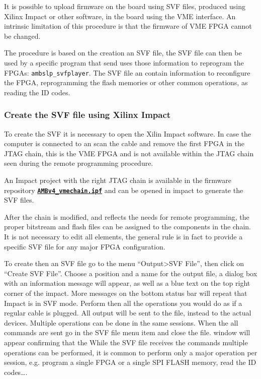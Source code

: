 It is possible to upload firmware on the board using SVF files,
produced using Xilinx Impact or other software, in the board
using the VME interface. An intrinsic limitation of this procedure is
that the firmware of VME FPGA cannot be changed.

The procedure is based on the creation an SVF file, the SVF file can then
be used by a specific program that send uses those information to reprogram
the FPGAs: \texttt{ambslp\_svfplayer}. The SVF file 
an contain information
to reconfigure the FPGA, reprogramming the flash memories or other
common operations, as reading the ID codes.

\subsubsection{Create the SVF file using Xilinx Impact}
To create the SVF it is necessary to open the Xilin Impact software. In case
the computer is connected to an \AMBoard scan the cable and remove the 
first FPGA in the JTAG chain, this is the VME FPGA and is not available
within the JTAG chain seen during the remote programming procedure.

An Impact project with the right JTAG chain is available in the firmware
repository \href{https://svnweb.cern.ch/trac/atlasftkfw/browser/AMboard/trunk/AMBSLP/AMBv4_vmechain.ipf}{\texttt{\textbf{AMBv4\_vmechain.ipf}}} and can be opened in impact to generate the SVF
files.

After the chain is modified, and reflects the needs for remote programming,
the proper bitstream and flash files can be assigned to the components in the
chain. It is not necessary to edit all elements, the general rule is in fact to
provide a specific SVF file for any major FPGA configuration.

To create then an SVF file go to the menu 
``Output>SVF File'', then click on ``Create SVF File''. Choose a position and
a name for the output file, a dialog box with an information message will appear,
as well as a blue text on the top right corner of the impact. More messages on the bottom
status bar will repeat that Impact is in SVF mode. Perform then all the operations
you would do as if a regular cable is plugged. All output will be sent to the file,
instead to the actual devices. Multiple operations can be done in the same sessions.
When the all commands are sent go in the SVF file menu item and close the file.
window will appear confirming that the 
While the SVF file receives the commands multiple operations can be performed,
it is common to perform only a major operation per session, e.g. program a single
FPGA or a single SPI FLASH memory, read the ID codes\ldots.


